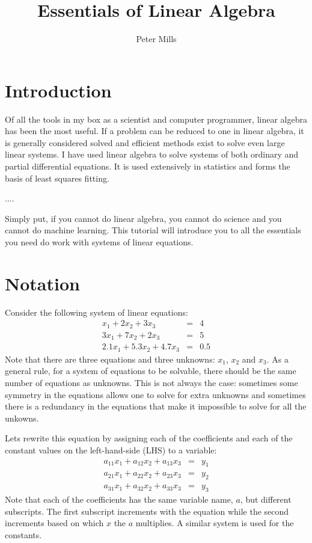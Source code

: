 \documentclass{article}
\begin{document}
\title{Essentials of Linear Algebra}

\author{Peter Mills}

\maketitle

\section{Introduction}

Of all the tools in my box as a scientist and computer programmer, linear
algebra has been the most useful.
If a problem can be reduced to one in linear algebra, it is generally 
considered solved and efficient methods exist to solve even large linear
systems.
I have used linear algebra to solve systems of both ordinary and partial
differential equations.
It is used extensively in statistics and forms the basis of least squares
fitting.

....

Simply put, if you cannot do linear algebra, you cannot do science and you
cannot do machine learning.
This tutorial will introduce you to all the essentials you need do work with
systems of linear equations.

\section{Notation}

\label{notation}

Consider the following system of linear equations:
\begin{eqnarray}
	x_1 + 2 x_2 + 3 x_3 & = & 4 \\ \nonumber
	3 x_1 + 7 x_2 + 2 x_3 & = & 5 \\ \nonumber
	2.1 x_1 + 5.3 x_2 + 4.7 x_3 & = & 0.5
	\label{example_system}
\end{eqnarray}
Note that there are three equations 
and three unknowns: $x_1$, $x_2$ and $x_3$.
As a general rule, for a system of equations to be solvable, there should be
the same number of equations as unknowns.
This is not always the case: sometimes some symmetry in the equations allows
one to solve for extra unknowns and sometimes there is a redundancy in the
equations that make it impossible to solve for all the unkowns.

Lets rewrite this equation by assigning each of the coefficients 
and each of the constant values on the left-hand-side (LHS)  
to a variable:
\begin{eqnarray}
	a_{11} x_1 + a_{12} x_2 + a_{13} x_3 & = & y_1 \\
	a_{21} x_1 + a_{22} x_2 + a_{23} x_3 & = & y_2 \\
	a_{31} x_1 + a_{32} x_2 + a_{33} x_3 & = & y_3
\end{eqnarray}
Note that each of the coefficients has the same variable name, $a$, but 
different subscripts.
The first subscript increments with the equation while the second increments
based on which $x$ the $a$ multiplies.
A similar system is used for the constants.
\end{document}
